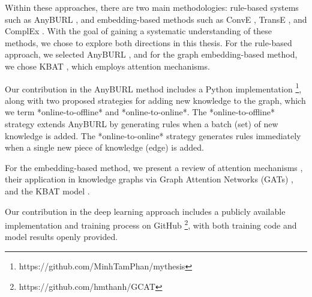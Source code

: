 Within these approaches, there are two main methodologies: rule-based systems such as AnyBURL \cite{burl}, and embedding-based methods such as ConvE \cite{dettmers2017convolutional}, TransE \cite{bordes2013translating}, and ComplEx \cite{trouillon2016complex}. With the goal of gaining a systematic understanding of these methods, we chose to explore both directions in this thesis. For the rule-based approach, we selected AnyBURL \cite{burl}, and for the graph embedding-based method, we chose KBAT \cite{nathani2019learning}, which employs attention mechanisms.

Our contribution in the AnyBURL method includes a Python implementation \footnote{https://github.com/MinhTamPhan/mythesis}, along with two proposed strategies for adding new knowledge to the graph, which we term *online-to-offline* and *online-to-online*. The *online-to-offline* strategy extends AnyBURL by generating rules when a batch (set) of new knowledge is added. The *online-to-online* strategy generates rules immediately when a single new piece of knowledge (edge) is added.

For the embedding-based method, we present a review of attention mechanisms \cite{vaswani2017attention}, their application in knowledge graphs via Graph Attention Networks (GATs) \cite{velivckovic2017graph}, and the KBAT model \cite{nathani2019learning}.

Our contribution in the deep learning approach includes a publicly available implementation and training process on GitHub \footnote{https://github.com/hmthanh/GCAT}, with both training code and model results openly provided.
